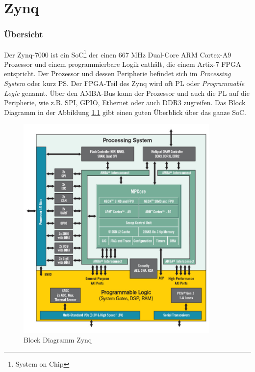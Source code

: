 
\chapter{Zynq}
\subsection{Übersicht}
Der Zynq-7000 ist ein SoC\footnote{System on Chip} der einen 667 MHz Dual-Core ARM Cortex-A9 Prozessor und einem programmierbare Logik enthält, die einem Artix-7 FPGA entspricht.
Der Prozessor und dessen Peripherie befindet sich im \textit{Processing System} oder kurz PS.
Der FPGA-Teil des Zynq wird oft PL oder \textit{Programmable Logic} genannt.
Über den AMBA-Bus kann der Prozessor und auch die PL auf die Peripherie, wie z.B. SPI, GPIO, Ethernet oder auch DDR3 zugreifen.
Das Block Diagramm in der Abbildung \ref{fig:BlockDiagrammZynq} gibt einen guten Überblick über das ganze SoC.

\begin{figure}[htbp]
	\centering
		\includegraphics[width=10cm,height=\textheight,keepaspectratio]{images/zynqBlockDiagram.png}
	\caption[Block Diagramm Zynq]{Block Diagramm Zynq\footnotemark}
	\label{fig:BlockDiagrammZynq}
\end{figure}


